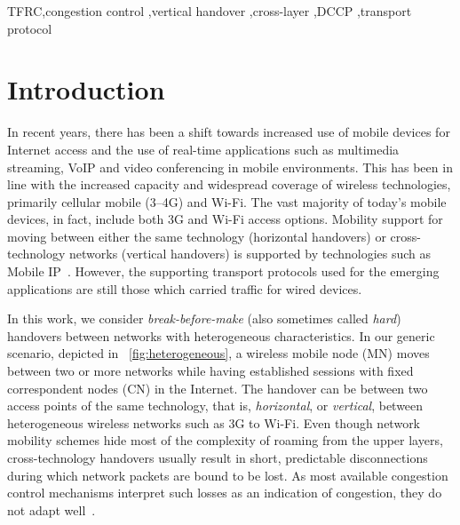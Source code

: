 \documentclass[twocolumn]{nictatechreport}
\begin{document}
\begin{keyword} TFRC\sep congestion control \sep vertical handover \sep cross-layer \sep DCCP
\sep transport protocol



\end{keyword} 




\mainmatter 

\section{Introduction}
\label{sec:intro}

In recent years, there has been a shift towards increased use of mobile devices
for Internet access and the use of real-time applications such as multimedia
streaming, VoIP and video conferencing in mobile environments.  This has been in
line with the increased capacity and widespread coverage of wireless
technologies, primarily cellular mobile (3--4G) and Wi-Fi. The vast majority of
today's mobile devices, in fact, include both 3G and Wi-Fi access options.
Mobility support for moving between either the same technology (horizontal
handovers) or cross-technology networks (vertical handovers) is supported by
technologies such as Mobile IP~\cite{rfc6275}.  However, the supporting
transport protocols used for the emerging applications are still those
which carried traffic for wired devices.

In this work, we consider \emph{break-before-make} (also sometimes called
\emph{hard}) handovers between networks with heterogeneous characteristics. In
our generic scenario,
depicted in \figurename~\ref{fig:heterogeneous}, a wireless mobile node (MN) moves between two or more networks while having
established sessions with fixed correspondent nodes (CN) in the Internet. The
handover can be between two access points of the same technology, that is,
\emph{horizontal}, or \emph{vertical}, between heterogeneous wireless networks
such as 3G to Wi-Fi.  Even though network mobility schemes hide most of the
complexity of roaming from the upper layers, cross-technology handovers usually
result in short, predictable disconnections during which network packets are
bound to be lost. As most available congestion control mechanisms interpret such
losses as an indication of congestion, they do not adapt
well~\cite{2002tsaoussidis_tcp_mobility_open_issues}.
\end{document}
